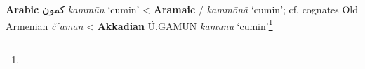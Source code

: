 \begin{etymology}\label{ety:kammun}
\textbf{Arabic} {كمون} \textit{kammūn} `cumin'
< \textbf{Aramaic} {/} \textit{kammōnā} `cumin'; cf. cognates Old Armenian  \textit{čʿaman}
< \textbf{Akkadian} { Ú.GAMUN} \textit{kamūnu} `cumin'\footnote{}
\end{etymology}
